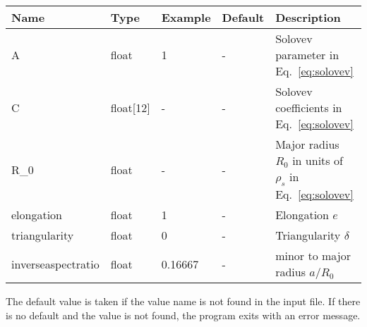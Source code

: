 \begin{longtable}{llll>{\RaggedRight}p{7cm}}
\toprule
\rowcolor{gray!50}\textbf{Name} &  \textbf{Type} & \textbf{Example} & \textbf{Default} & \textbf{Description}  \\ \midrule
    A      & float & 1 &  - & Solovev parameter in Eq.~\eqref{eq:solovev} \\
    C      & float[12] &  - & - & Solovev coefficients in Eq.~\eqref{eq:solovev}  \\
    R\_0   & float & - & -  & Major radius $R_0$ in units of $\rho_s$ in Eq.~\eqref{eq:solovev} \\
    elongation    & float & 1 & - & Elongation $e$ \\
    triangularity & float & 0 & - & Triangularity $\delta$ \\
    inverseaspectratio & float & 0.16667 & - & minor to major radius $a/R_0$ \\
\bottomrule
\end{longtable}
The default value is taken if the value name is not found in the input file. If there is no default and
the value is not found,
the program exits with an error message.


